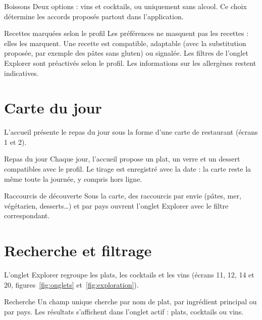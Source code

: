 \begin{exigence}[priorite=haute]{Boissons}
  Deux options : vins et cocktails, ou uniquement sans alcool. Ce choix
  détermine les accords proposés partout dans l'application.
\end{exigence}

\begin{exigence}[priorite=haute]{Recettes marquées selon le profil}
  Les préférences ne masquent pas les recettes : elles les marquent. Une
  recette est compatible, adaptable (avec la substitution proposée, par
  exemple des pâtes sans gluten) ou signalée. Les filtres de l'onglet
  Explorer sont préactivés selon le profil. Les informations sur les
  allergènes restent indicatives.
\end{exigence}

\section{Carte du jour}

L'accueil présente le repas du jour sous la forme d'une carte de restaurant
(écrans 1 et 2).

\begin{exigence}[priorite=haute]{Repas du jour}
  Chaque jour, l'accueil propose un plat, un verre et un dessert compatibles
  avec le profil. Le tirage est enregistré avec la date : la carte reste la
  même toute la journée, y compris hors ligne.
\end{exigence}

\begin{exigence}[priorite=moyenne]{Raccourcis de découverte}
  Sous la carte, des raccourcis par envie (pâtes, mer, végétarien,
  desserts…) et par pays ouvrent l'onglet Explorer avec le filtre
  correspondant.
\end{exigence}

\section{Recherche et filtrage}

L'onglet Explorer regroupe les plats, les cocktails et les vins
(écrans 11, 12, 14 et 20, figures~\ref{fig:onglets} et~\ref{fig:exploration}).

\begin{exigence}[priorite=haute]{Recherche}
  Un champ unique cherche par nom de plat, par ingrédient principal ou par
  pays. Les résultats s'affichent dans l'onglet actif : plats, cocktails ou
  vins.
\end{exigence}

